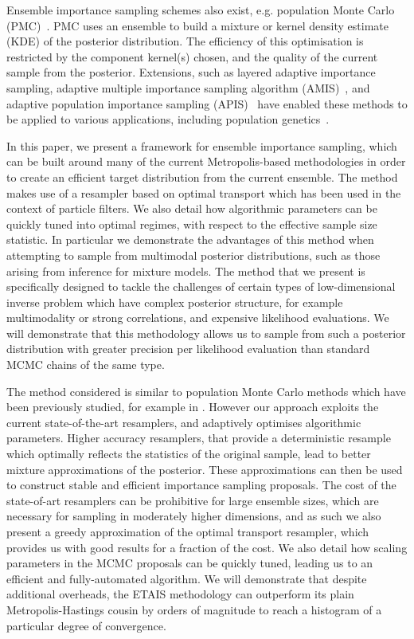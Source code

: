 \documentclass[final]{siamltex}
\begin{document}
Ensemble importance sampling schemes also exist, e.g. population Monte Carlo (PMC)~\cite{cappe2012population}. PMC uses an ensemble to build a mixture or kernel density estimate (KDE) of the
posterior distribution. The efficiency of
this optimisation is restricted by the component kernel(s) chosen, and
the quality of the current sample from the posterior\cite{cappe2008adaptive,douc2007convergence,douc2007minimum}. Extensions, such
as layered adaptive importance sampling\cite{martino2017layered}, adaptive multiple importance sampling algorithm
(AMIS)~\cite{cornuet2012adaptive}, and adaptive population importance sampling
(APIS)~\cite{martino2015adaptive} have enabled these methods to be
applied to various applications, including population
genetics~\cite{siren2011reconstructing}.

{\red In this paper, we present a framework for ensemble
importance sampling, which can be built around many of the current
Metropolis-based methodologies in order to create an efficient target
distribution from the current
ensemble.} The method makes use of a resampler based on optimal
transport which has been used in the context of particle
filters\cite{reich2013nonparametric}. We also detail how algorithmic
parameters can be quickly tuned into optimal regimes, with respect to
the effective sample size statistic. In particular we demonstrate the
advantages of this method when attempting to sample from multimodal
posterior distributions, such as those arising from inference for
mixture models. The method that we present is specifically designed to
tackle the challenges of certain types of low-dimensional inverse
problem which have complex posterior structure, for example
multimodality or strong correlations, and expensive
likelihood evaluations. We will demonstrate that this methodology
allows us to sample from such a posterior distribution with greater
precision per likelihood evaluation than 
standard MCMC chains of the same type.

The method considered is similar to population Monte Carlo methods
which have been previously studied, for example in
\cite{elvira2017improving}. However our approach exploits the current
state-of-the-art resamplers, and adaptively optimises algorithmic parameters. Higher accuracy resamplers, that provide
a deterministic resample which optimally reflects the statistics of
the original sample, lead to better mixture approximations of the
posterior. These approximations can then be used to construct stable
and efficient importance sampling proposals. The cost of the
state-of-art resamplers can be prohibitive for large ensemble sizes,
which are necessary for sampling in moderately higher dimensions, and
as such we also present a greedy approximation of the optimal
transport resampler, which provides us with good results for a
fraction of the cost. We also detail how scaling parameters in the
MCMC proposals can be quickly tuned, leading us to an efficient and
fully-automated algorithm. We will demonstrate that despite additional
overheads, the ETAIS methodology can outperform its plain
Metropolis-Hastings cousin by orders of magnitude to reach a histogram
of a particular degree of convergence.
\end{document}
